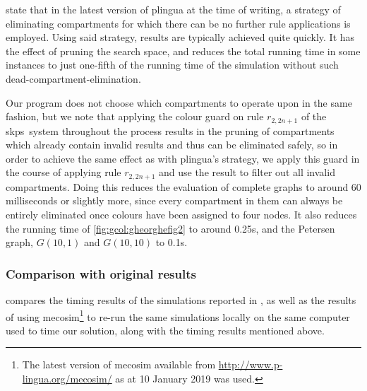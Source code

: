 \citeauthor{Gheorghe2013} state \cite[p.~828]{Gheorghe2013} that in the latest version of \gls{plingua} at the time of writing, a strategy of eliminating compartments for which there can be no further rule applications is employed.  Using said strategy, results are typically achieved quite quickly.  It has the effect of pruning the search space, and reduces the total running time in some instances to just one-fifth of the running time of the simulation without such dead-compartment-elimination.

Our program does not choose which compartments to operate upon in the same fashion, but we note that applying the colour guard on rule \(r_{2,2n+1}\) of the \gls{skps}~system throughout the process results in the pruning of compartments which already contain invalid results and thus can be eliminated safely, so in order to achieve the same effect as with \gls{plingua}'s strategy, we apply this guard in the course of applying rule \(r_{2,2n+1}\) and use the result to filter out all invalid compartments.  Doing this reduces the evaluation of complete graphs to around 60 milliseconds or slightly more, since every compartment in them can always be entirely eliminated once colours have been assigned to four nodes.  It also reduces the running time of \cref{fig:gcol:gheorghefig2} to around 0.25s, and the Petersen graph, \(G(10,1)\) and \(G(10,10)\) to 0.1s.

\subsubsection{Comparison with original results}

 compares the timing results of the simulations reported in \cite{Gheorghe2013}, as well as the results of using \gls{mecosim}\footnote{The latest version of \gls{mecosim} available from \url{http://www.p-lingua.org/mecosim/} as at 10 January 2019 was used.} \cite{Perez-Hurtado2010} to re-run the same simulations locally on the same computer used to time our solution, along with the timing results mentioned above.


